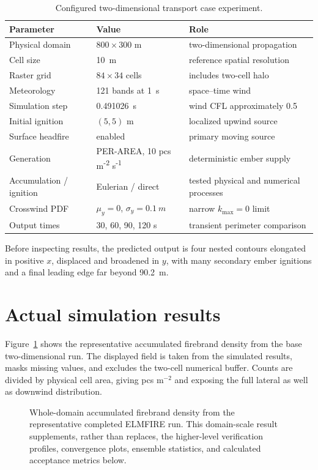\begin{table}[htbp]
\centering
\caption{Configured two-dimensional transport case experiment.}
\begin{tabular}{lll}\toprule
Parameter & Value & Role\\
\midrule
Physical domain & $800\times300$ m & two-dimensional propagation\\
Cell size & \SI{10}{m} & reference spatial resolution\\
Raster grid & $84\times34$ cells & includes two-cell halo\\
Meteorology & 121 bands at \SI{1}{s} & space--time wind\\
Simulation step & \SI{0.491026}{s} & wind CFL approximately 0.5\\
Initial ignition & $(5,5)$ m & localized upwind source\\
Surface headfire & enabled & primary moving source\\
Generation & PER-AREA, 10 pcs m\textsuperscript{-2} s\textsuperscript{-1} & deterministic ember supply\\
Accumulation / ignition & Eulerian / direct & tested physical and numerical processes\\
Crosswind PDF & $\mu_y=0$, $\sigma_y=\SI{0.1}{m}$ & narrow $k_{\max}=0$ limit\\
Output times & 30, 60, 90, 120 s & transient perimeter comparison\\
\bottomrule
\end{tabular}
\end{table}
Before inspecting results, the predicted output is four nested contours elongated in positive $x$, displaced and broadened in $y$, with many secondary ember ignitions and a final leading edge far beyond \SI{90.2}{m}.

\section{Actual simulation results}

Figure~\ref{fig:domain-result} shows the representative accumulated firebrand density from the base two-dimensional run.
The displayed field is taken from the simulated results, masks missing values, and excludes
the two-cell numerical buffer.  Counts are divided by physical cell area, giving pcs m$^{-2}$ and exposing the full lateral as well as downwind distribution.

\begin{figure}[H]
\centering
{}
\caption{Whole-domain accumulated firebrand density from the representative completed ELMFIRE run.  This
domain-scale result supplements, rather than replaces, the higher-level verification
profiles, convergence plots, ensemble statistics, and calculated acceptance metrics below.}
\label{fig:domain-result}
\end{figure}


